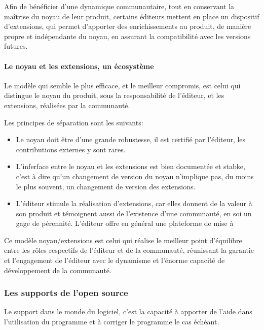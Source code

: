 			Afin de bénéficier d'une dynamique communautaire, tout en conservant la maîtrise du noyau de leur produit, certains éditeurs mettent en place un dispositif d'extensions, qui permet d'apporter des enrichissements au produit, de manière propre et indépendante du noyau, en assurant la compatibilité avec les versions futures.

			\paragraph{Le noyau et les extensions, un écosystème\\}

			Le modèle qui semble le plus efficace, et le meilleur compromis, est celui qui distingue le noyau du produit, sous la responsabilité de l'éditeur, et les extensions, réalisées par la communauté.

			Les principes de séparation sont les suivants:

			\begin{itemize}[label=\textbullet, font=\LARGE \color{burntorange}]
				\item Le noyau doit être d'une grande robustesse, il est certifié par l'éditeur, les contributions externes y sont rares.

				\item L'inferface entre le noyau et les extensions est bien documentée et stabke, c'est à dire qu'un changement de version du noyau n'implique pas, du moins le plus souvent, un changement de version des extensions.

				\item L'éditeur stimule la réalisation d'extensions, car elles donnent de la valeur à son produit et témoignent aussi de l'existence d'une communauté, en soi un gage de pérennité. L'éditeur offre en général une plateforme de mise à 
			\end{itemize}

			Ce modèle noyau/extensions est celui qui réalise le meilleur point d'équilibre entre les rôles respectifs de l'éditeur et de la communauté, réunissant la garantie et l'engagement de l'éditeur avec le dynamisme et l'énorme capacité de développement de la communauté.

			\subsubsection{Les supports de l'open source}

				Le support dans le monde du logiciel, c'est la capacité à apporter de l'aide dans l'utilisation du programme et à corriger le programme le cas échéant.\\
				
